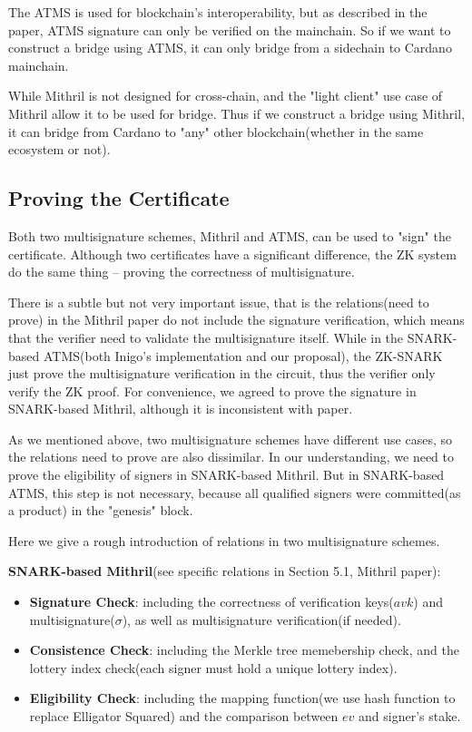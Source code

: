 \documentclass{article}
\begin{document}
The ATMS is used for blockchain's interoperability, but as described in the paper, ATMS signature can only be verified on the mainchain. So if we want to construct a bridge using ATMS, it can only bridge from a sidechain to Cardano mainchain.

While Mithril is not designed for cross-chain, and the "light client" use case of Mithril allow it to be used for bridge. Thus if we construct a bridge using Mithril, it can bridge from Cardano to "any" other blockchain(whether in the same ecosystem or not).

\subsection{Proving the Certificate}

Both two multisignature schemes, Mithril and ATMS, can be used to "sign" the certificate. Although two certificates have a significant difference, the ZK system do the same thing -- proving the correctness of multisignature. 

There is a subtle but not very important issue, that is the relations(need to prove) in the Mithril paper do not include the signature verification, which means that the verifier need to validate the multisignature itself. While in the SNARK-based ATMS(both Inigo's implementation and our proposal), the ZK-SNARK just prove the multisignature verification in the circuit, thus the verifier only verify the ZK proof. For convenience, we agreed to prove the signature in SNARK-based Mithril, although it is inconsistent with paper.


As we mentioned above, two multisignature schemes have different use cases, so the relations need to prove are also dissimilar. In our understanding, we need to prove the eligibility of signers in SNARK-based Mithril. But in SNARK-based ATMS, this step is not necessary, because all qualified signers were committed(as a product) in the "genesis" block.

Here we give a rough introduction of relations in two multisignature schemes.

\vspace{0.3cm}
\textbf{SNARK-based Mithril}(see specific relations in Section 5.1, Mithril paper):

\begin{itemize}
    \item \textbf{Signature Check}: including the correctness of verification keys($avk$) and multisignature($\sigma$), as well as multisignature verification(if needed).
    \item \textbf{Consistence Check}: including the Merkle tree memebership check, and the lottery index check(each signer must hold a unique lottery index).
    \item \textbf{Eligibility Check}: including the mapping function(we use hash function to replace Elligator Squared) and the comparison between $ev$ and signer's stake.
\end{itemize}
\end{document}
